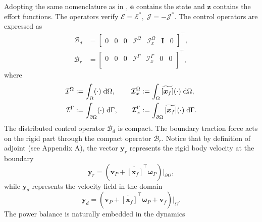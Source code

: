 \documentclass{svjour3}                     %
\newcommand{\crmat}[1]{\ensuremath{\widetilde{\left[#1\right]}}}
\begin{document}
Adopting the same nomenclature as in \cite{mehrmann2019structurepreserving}, $\bm{e}$ contains the state and $\bm{z}$ contains the effort functions. The operators verify $\bm{\mathcal{E}} = \bm{\mathcal{E}}^*, \; \bm{\mathcal{J}} = -\bm{\mathcal{J}}^*$. The control operators are expressed as
\begin{align*}
\bm{\mathcal{B}}_d &= 
\begin{bmatrix}
0 & 0 & 0 & \mathcal{I}^\Omega & \bm{\mathcal{I}}_{x}^\Omega & \bm{I} & 0
\end{bmatrix}^\top, \\
\bm{\mathcal{B}}_r &= 
\begin{bmatrix}
0 & 0 & 0 & \mathcal{I}^{\Gamma} & \bm{\mathcal{I}}_{x}^{\Gamma} & 0 & 0 \\
\end{bmatrix}^\top,
\end{align*}
where 
\begin{equation*}
\begin{aligned}
\mathcal{I}^\Omega &:=\int_{\Omega} (\cdot) \d{\Omega}, \\
\mathcal{I}^{\Gamma} &:= \int_{\partial \Omega} (\cdot) \d{\Gamma}, \\
\end{aligned} \qquad
\begin{aligned} 
\bm{\mathcal{I}}_{x}^\Omega &:=\int_{\Omega} \crmat{\bm{x}_f} (\cdot) \d{\Omega}, \\
\bm{\mathcal{I}}_{x}^{\Gamma} &:=\int_{\partial \Omega} \crmat{\bm{x}_f} (\cdot) \d{\Gamma}. \\
\end{aligned}
\end{equation*}
The distributed control operator $\bm{\mathcal{B}}_d$  is compact. The boundary traction force acts on the rigid part through the compact operator $\bm{\mathcal{B}}_r$. Notice that by definition of adjoint (see Appendix A), the vector $\bm{y}_r$ represents the rigid body velocity at the boundary
\[
\bm{y}_r = (\bm{v}_P + \crmat{\bm{x}_f}^\top \bm{\omega}_P)\vert_{\partial\Omega},
\] 
while $\bm{y}_d$ represents the velocity field in the domain
\[
\bm{y}_d = (\bm{v}_P + \crmat{\bm{x}_f}^\top \bm{\omega}_P + \bm{v}_f)\vert_{\Omega}.
\]
The power balance is naturally embedded in the dynamics 
\end{document}

